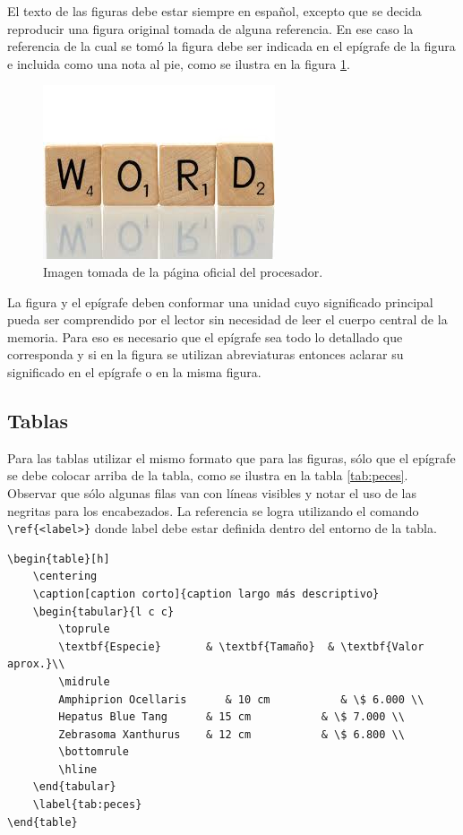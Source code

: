 El texto de las figuras debe estar siempre en español, excepto que se decida reproducir una figura original tomada de alguna referencia. En ese caso la referencia de la cual se tomó la figura debe ser indicada en el epígrafe de la figura e incluida como una nota al pie, como se ilustra en la figura \ref{fig:palabraIngles}.

\begin{figure}[h!]
	\centering
	\includegraphics[scale=.25]{./Figures/word.jpeg}
	\caption{Imagen tomada de la página oficial del procesador\protect\footnotemark.}
	\label{fig:palabraIngles}
\end{figure}



La figura y el epígrafe deben conformar una unidad cuyo significado principal pueda ser comprendido por el lector sin necesidad de leer el cuerpo central de la memoria. Para eso es necesario que el epígrafe sea todo lo detallado que corresponda y si en la figura se utilizan abreviaturas entonces aclarar su significado en el epígrafe o en la misma figura.


\subsection{Tablas}

Para las tablas utilizar el mismo formato que para las figuras, sólo que el epígrafe se debe colocar arriba de la tabla, como se ilustra en la tabla \ref{tab:peces}. Observar que sólo algunas filas van con líneas visibles y notar el uso de las negritas para los encabezados.  La referencia se logra utilizando el comando \verb|\ref{<label>}| donde label debe estar definida dentro del entorno de la tabla.

\begin{verbatim}
\begin{table}[h]
	\centering
	\caption[caption corto]{caption largo más descriptivo}
	\begin{tabular}{l c c}    
		\toprule
		\textbf{Especie}       & \textbf{Tamaño}  & \textbf{Valor aprox.}\\
		\midrule
		Amphiprion Ocellaris	  & 10 cm 			& \$ 6.000 \\		
		Hepatus Blue Tang      & 15 cm			 & \$ 7.000 \\
		Zebrasoma Xanthurus    & 12 cm			 & \$ 6.800 \\
		\bottomrule
		\hline
	\end{tabular}
	\label{tab:peces}
\end{table}
\end{verbatim}

